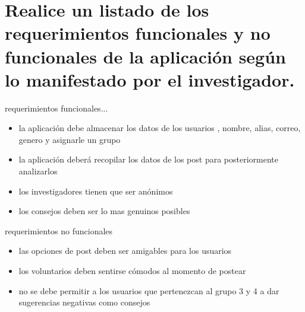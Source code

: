 \documentclass[10pt,a4paper]{article} %
\begin{document}
    \section{Realice un listado de los requerimientos funcionales y no funcionales de la aplicación según lo
    manifestado por el investigador.}
        requerimientos funcionales...
        \begin{itemize}
            \item {la aplicación debe almacenar los datos de los usuarios , nombre, alias, correo, genero y asignarle un grupo}
            \item {la aplicación deberá recopilar los datos de los post para posteriormente analizarlos}
            \item {los investigadores tienen que ser anónimos}
            \item {los consejos deben ser lo mas genuinos posibles}
        \end{itemize}
        requerimientos no funcionales
        \begin{itemize}
            \item {las opciones de post deben ser amigables para los usuarios}
            \item {los voluntarios deben sentirse cómodos al momento de postear}
            \item {no se debe permitir a los usuarios que pertenezcan al grupo
                3 y 4 a dar sugerencias negativas como consejos}
        \end{itemize}























    \nocite{*}
    
    
\end{document}
